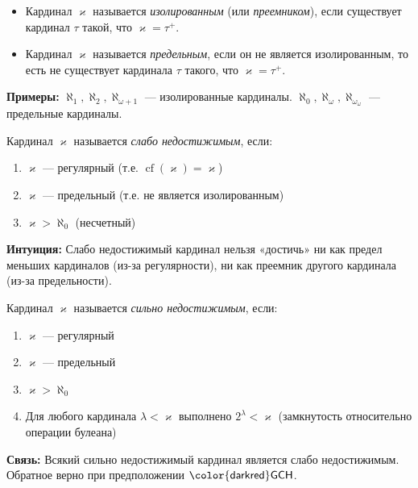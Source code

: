 \documentclass[11pt, a4paper]{extarticle}
\newcommand{\la}{\lambda}
\newcommand{\ka}{\varkappa}
\newcommand{\GCH}{\ifmmode \mathsf{GCH}\else ${\mathsf{\color{darkred}GCH}}$\fi\xspace}
\newcommand{\cf}{\mathop{\mathrm{cf}}}
\begin{document}
\begin{definition}
\begin{itemize}
    \item Кардинал $\ka$ называется \textit{изолированным} (или \textit{преемником}), если существует кардинал $\tau$ такой, что $\ka = \tau^+$.
    \item Кардинал $\ka$ называется \textit{предельным}, если он не является изолированным, то есть не существует кардинала $\tau$ такого, что $\ka = \tau^+$.
\end{itemize}

\textbf{Примеры:} $\aleph_1, \aleph_2, \aleph_{\omega+1}$ — изолированные кардиналы. $\aleph_0, \aleph_\omega, \aleph_{\omega_\omega}$ — предельные кардиналы.
\end{definition}

\begin{definition}
Кардинал $\ka$ называется \textit{слабо недостижимым}, если:
\begin{enumerate}
    \item $\ka$ — регулярный (т.е. $\cf(\ka) = \ka$)
    \item $\ka$ — предельный (т.е. не является изолированным)
    \item $\ka > \aleph_0$ (несчетный)
\end{enumerate}

\textbf{Интуиция:} Слабо недостижимый кардинал нельзя «достичь» ни как предел меньших кардиналов (из-за регулярности), ни как преемник другого кардинала (из-за предельности).
\end{definition}

\begin{definition}
Кардинал $\ka$ называется \textit{сильно недостижимым}, если:
\begin{enumerate}
    \item $\ka$ — регулярный
    \item $\ka$ — предельный
    \item $\ka > \aleph_0$
    \item Для любого кардинала $\la < \ka$ выполнено $2^{\la} < \ka$ (замкнутость относительно операции булеана)
\end{enumerate}

\textbf{Связь:} Всякий сильно недостижимый кардинал является слабо недостижимым. Обратное верно при предположении \GCH.
\end{definition}
\end{document}
